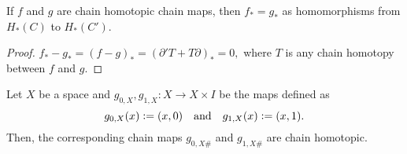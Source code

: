 \documentclass[12pt]{article}
\begin{document}
\begin{prop} \label{prop:chainhomotopicmapssamehomomorphism}
	If $f$ and $g$ are chain homotopic chain maps, then $f_* = g_*$ as homomorphisms from $H_*(C)$ to $H_*(C').$
\end{prop}
\begin{proof} 
	$f_* - g_* = (f - g)_* = (\partial'T + T\partial)_* = 0,$ where $T$ is any chain homotopy between $f$ and $g.$
\end{proof}

\begin{lem} \label{lem:toughlemmachainhomotopic}
	Let $X$ be a space and $g_{0, X}, g_{1, X}:X \to X\times I$ be the maps defined as
	\begin{equation*} 
		g_{0, X}(x) \vcentcolon= (x, 0) \quad\text{and}\quad g_{1, X}(x) \vcentcolon= (x, 1).
	\end{equation*}
	Then, the corresponding chain maps $g_{0, X\#}$ and $g_{1, X\#}$ are chain homotopic.
\end{lem}
\end{document}
